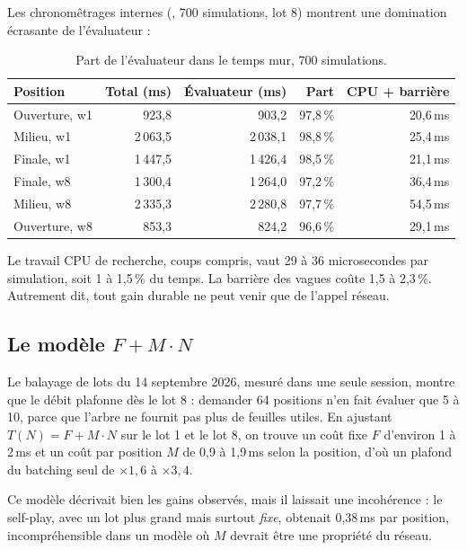Les chronom\^etrages internes (, 700 simulations, lot 8)
montrent une domination \'ecrasante de l'\'evaluateur :

\begin{table}[h]
\centering
\small
\caption{Part de l'\'evaluateur dans le temps mur, 700 simulations.}
\label{tab:phases}
\begin{tabular}{lrrrr}
\toprule
Position & Total (ms) & \'Evaluateur (ms) & Part & CPU + barri\`ere \\
\midrule
Ouverture, w1 & 923,8 & 903,2 & 97,8\,\% & 20,6\,ms \\
Milieu, w1 & 2\,063,5 & 2\,038,1 & 98,8\,\% & 25,4\,ms \\
Finale, w1 & 1\,447,5 & 1\,426,4 & 98,5\,\% & 21,1\,ms \\
Finale, w8 & 1\,300,4 & 1\,264,0 & 97,2\,\% & 36,4\,ms \\
Milieu, w8 & 2\,335,3 & 2\,280,8 & 97,7\,\% & 54,5\,ms \\
Ouverture, w8 & 853,3 & 824,2 & 96,6\,\% & 29,1\,ms \\
\bottomrule
\end{tabular}
\end{table}

Le travail CPU de recherche, coups compris, vaut 29 \`a 36 microsecondes par
simulation, soit 1 \`a 1,5\,\% du temps. La barri\`ere des vagues co\^ute 1,5 \`a
2,3\,\%. Autrement dit, tout gain durable ne peut venir que de l'appel
r\'eseau.

\subsection{Le mod\`ele \texorpdfstring{$F + M \cdot N$}{F + M x N}}

Le balayage de lots du 14 septembre 2026, mesur\'e dans une seule session,
montre que le d\'ebit plafonne d\`es le lot 8 : demander 64 positions n'en fait
\'evaluer que 5 \`a 10, parce que l'arbre ne fournit pas plus de feuilles
utiles. En ajustant $T(N) = F + M \cdot N$ sur le lot 1 et le lot 8, on trouve
un co\^ut fixe $F$ d'environ 1 \`a 2\,ms et un co\^ut par position $M$ de 0,9 \`a
1,9\,ms selon la position, d'o\`u un plafond du batching seul de
$\times 1{,}6$ \`a $\times 3{,}4$.

Ce mod\`ele d\'ecrivait bien les gains observ\'es, mais il laissait une
incoh\'erence : le self-play, avec un lot plus grand mais surtout \emph{fixe},
obtenait 0,38\,ms par position, incompr\'ehensible dans un mod\`ele o\`u $M$
devrait \^etre une propri\'et\'e du r\'eseau.

